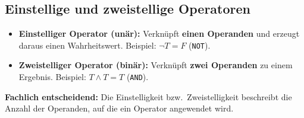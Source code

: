 \subsection*{Einstellige und zweistellige Operatoren}
\begin{itemize}
  \item \textbf{Einstelliger Operator (unär):} Verknüpft \textbf{einen Operanden}
        und erzeugt daraus einen Wahrheitswert. Beispiel: $\neg T = F$ (\texttt{NOT}).
  \item \textbf{Zweistelliger Operator (binär):} Verknüpft \textbf{zwei Operanden}
        zu einem Ergebnis. Beispiel: $T \wedge T = T$ (\texttt{AND}).
\end{itemize}
\textbf{Fachlich entscheidend:} Die Einstelligkeit bzw.\ Zweistelligkeit
beschreibt die Anzahl der Operanden, auf die ein Operator angewendet wird.

